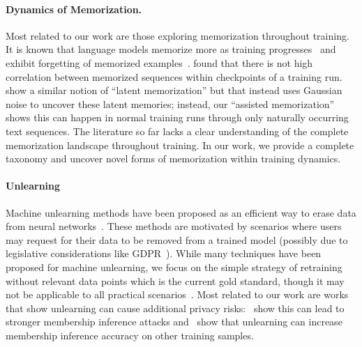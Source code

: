 \paragraph{Dynamics of Memorization.} 
Most related to our work are those exploring memorization throughout training. It is known that language models memorize more as training progresses~\citep{tirumala2022memorization, recite,huang-etal-2024-demystifying} and exhibit forgetting of memorized examples~\citep{jagielski2022measuring}. \citet{biderman2023emergent} found that there is not high correlation between memorized sequences within checkpoints of a training run. \citet{duan2024uncoveringlatentmemoriesassessing} show a similar notion of ``latent memorization'' but that instead  uses Gaussian noise to uncover these latent memories; instead, our ``assisted memorization'' shows this can happen in normal training runs through only naturally occurring text sequences. The literature so far lacks a clear understanding of the complete memorization landscape throughout training. In our work, we provide a complete taxonomy and uncover novel forms of memorization within training dynamics. 
\vspace{-1em}

\vspace{-1em}
\paragraph{Unlearning} 
Machine unlearning methods have been proposed as an efficient way to erase data from neural networks~\citep{sisa, approx_deletion, unlearning_auditing}. These methods are motivated by scenarios where users may request for their data to be removed from a trained model (possibly due to legislative considerations like GDPR~\citep{Fabbrini_Celeste_2020}). While many techniques have been proposed for machine unlearning, we focus on the simple strategy of retraining without relevant data points which is the current gold standard, though it may not be applicable to all practical scenarios~\citep{cooper2024machineunlearningdoesntthink}. Most related to our work are works that show unlearning can cause additional privacy risks:~\citet{jeopardize} show this can lead to stronger membership inference attacks and~\citet{onioneffect, hayes2024inexact} show that unlearning can increase membership inference accuracy on other training samples. 
 

 
